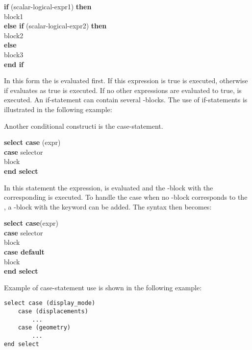 \begin{fsyntax}
\textbf{if} (scalar-logical-expr1) \textbf{then}\\
\ftab block1\\
\textbf{else if} (scalar-logical-expr2) \textbf{then}\\
\ftab block2\\
\textbf{else}\\
\ftab block3\\
\textbf{end if}
\end{fsyntax}

In this form the  is evaluated first. If this expression is true  is executed, otherwise if  evaluates as true  is executed. If no other expressions are evaluated to true,  is executed. An if-statement can contain several -blocks. The use of if-statements is illustrated in the following example:



Another conditional constructi is the case-statement.

\begin{fsyntax}
\textbf{select case} (expr)\\
\ftab\textbf{case} selector \\
\ftab\ftab block  \\
\textbf{end select}
\end{fsyntax}

In this statement the expression,  is evaluated and the -block with the corresponding  is executed. To handle the case when no -block corresponds to the , a -block with the  keyword can be added. The syntax then becomes:

\begin{fsyntax}
\textbf{select case}(expr)\\
\ftab\textbf{case} selector\\
\ftab\ftab block \\
\ftab\textbf{case default}\\
\ftab\ftab block \\
\textbf{end select}
\end{fsyntax}

Example of case-statement use is shown in the following example:

\begin{lstlisting}
select case (display_mode)
    case (displacements)
        ...
    case (geometry)
        ...
end select
\end{lstlisting}

